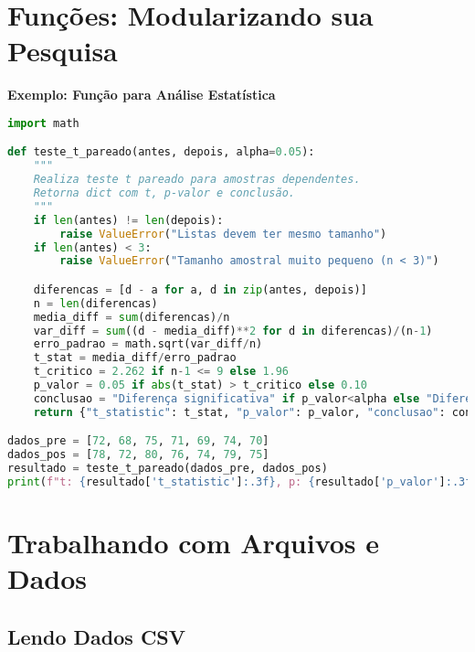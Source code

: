 \section{Funções: Modularizando sua Pesquisa}

\begin{examplebox}
\textbf{Exemplo: Função para Análise Estatística}

\begin{lstlisting}[language=Python,breaklines=true,postbreak=\mbox{\textcolor{red}{$\hookrightarrow$}\space}]
import math

def teste_t_pareado(antes, depois, alpha=0.05):
    """
    Realiza teste t pareado para amostras dependentes.
    Retorna dict com t, p-valor e conclusão.
    """
    if len(antes) != len(depois):
        raise ValueError("Listas devem ter mesmo tamanho")
    if len(antes) < 3:
        raise ValueError("Tamanho amostral muito pequeno (n < 3)")

    diferencas = [d - a for a, d in zip(antes, depois)]
    n = len(diferencas)
    media_diff = sum(diferencas)/n
    var_diff = sum((d - media_diff)**2 for d in diferencas)/(n-1)
    erro_padrao = math.sqrt(var_diff/n)
    t_stat = media_diff/erro_padrao
    t_critico = 2.262 if n-1 <= 9 else 1.96
    p_valor = 0.05 if abs(t_stat) > t_critico else 0.10
    conclusao = "Diferença significativa" if p_valor<alpha else "Diferença não significativa"
    return {"t_statistic": t_stat, "p_valor": p_valor, "conclusao": conclusao}

dados_pre = [72, 68, 75, 71, 69, 74, 70]
dados_pos = [78, 72, 80, 76, 74, 79, 75]
resultado = teste_t_pareado(dados_pre, dados_pos)
print(f"t: {resultado['t_statistic']:.3f}, p: {resultado['p_valor']:.3f}, {resultado['conclusao']}")
\end{lstlisting}
\end{examplebox}

\section{Trabalhando com Arquivos e Dados}

\subsection{Lendo Dados CSV}

